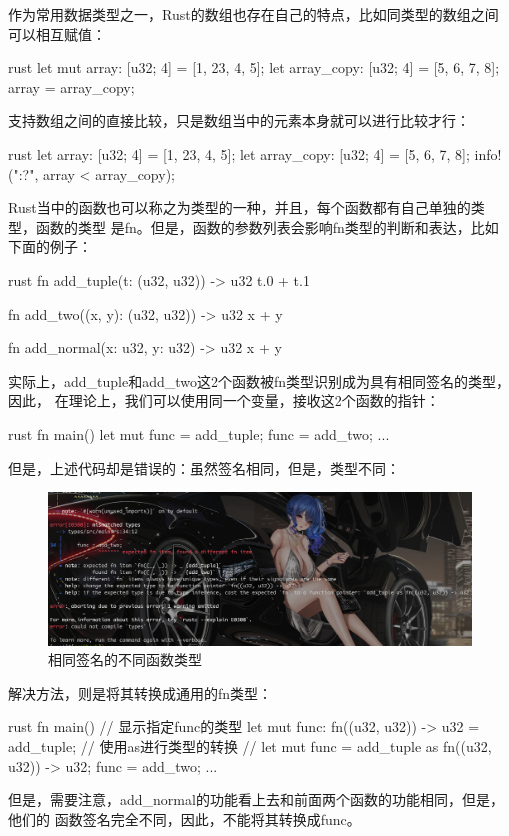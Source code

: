 作为常用数据类型之一，Rust的数组也存在自己的特点，比如同类型的数组之间可以相互赋值：
\begin{code-block}{rust}
let mut array: [u32; 4] = [1, 23, 4, 5];
let array_copy: [u32; 4] = [5, 6, 7, 8];
array = array_copy;
\end{code-block}
支持数组之间的直接比较，只是数组当中的元素本身就可以进行比较才行：
\begin{code-block}{rust}
let array: [u32; 4] = [1, 23, 4, 5];
let array_copy: [u32; 4] = [5, 6, 7, 8];
info!("{:?}", array < array_copy);
\end{code-block}

Rust当中的函数也可以称之为类型的一种，并且，每个函数都有自己单独的类型，函数的类型
是fn。但是，函数的参数列表会影响fn类型的判断和表达，比如下面的例子：
\begin{code-block}{rust}
fn add_tuple(t: (u32, u32)) -> u32 {
    t.0 + t.1
}

fn add_two((x, y): (u32, u32)) -> u32 {
    x + y
}

fn add_normal(x: u32, y: u32) -> u32 {
    x + y
}

\end{code-block}
实际上，add\_tuple和add\_two这2个函数被fn类型识别成为具有相同签名的类型，因此，
在理论上，我们可以使用同一个变量，接收这2个函数的指针：
\begin{code-block}{rust}
fn main() {
    let mut func = add_tuple;
    func = add_two;
    ...
}
\end{code-block}
但是，上述代码却是错误的：虽然签名相同，但是，类型不同：
\begin{figure}[H]
  \centering
  \includegraphics[width=\linewidth]{rust_func_type.png}
  \caption{相同签名的不同函数类型}
  \label{fig:rust_func_type}
\end{figure}
解决方法，则是将其转换成通用的fn类型：
\begin{code-block}{rust}
fn main() {
    // 显示指定func的类型
    let mut func: fn((u32, u32)) -> u32 = add_tuple;
    // 使用as进行类型的转换
    // let mut func = add_tuple as fn((u32, u32)) -> u32;
    func = add_two;
    ...
}
\end{code-block}
但是，需要注意，add\_normal的功能看上去和前面两个函数的功能相同，但是，他们的
函数签名完全不同，因此，不能将其转换成func。

